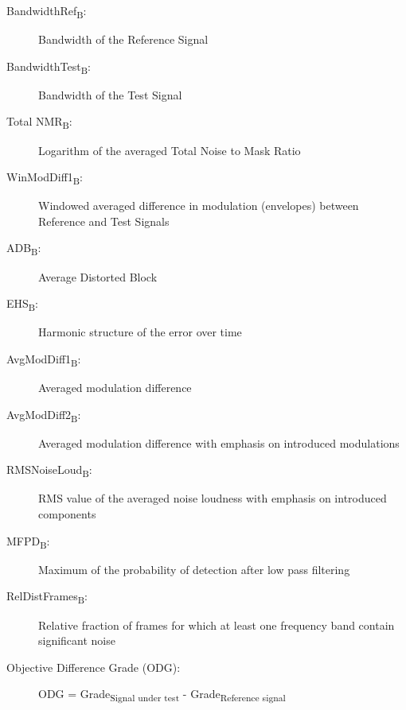 \begin{description}
\item[BandwidthRef\textsubscript{B}:] Bandwidth of the Reference Signal
\item[BandwidthTest\textsubscript{B}:] Bandwidth of the Test Signal
\item[Total NMR\textsubscript{B}:] Logarithm of the averaged Total Noise to Mask Ratio
\item[WinModDiff1\textsubscript{B}:] Windowed averaged difference in modulation (envelopes) between Reference and Test Signals
\item[ADB\textsubscript{B}:] Average Distorted Block
\item[EHS\textsubscript{B}:] Harmonic structure of the error over time
\item[AvgModDiff1\textsubscript{B}:] Averaged modulation difference
\item[AvgModDiff2\textsubscript{B}:] Averaged modulation difference with emphasis on introduced modulations
\item[RMSNoiseLoud\textsubscript{B}:] RMS value of the averaged noise loudness with emphasis on introduced components
\item[MFPD\textsubscript{B}:] Maximum of the probability of detection after low pass filtering
\item[RelDistFrames\textsubscript{B}:] Relative fraction of frames for which at least one frequency band contain significant noise
\item[Objective Difference Grade (ODG):] ODG = Grade\textsubscript{Signal under test} - Grade\textsubscript{Reference signal}
\end{description}


